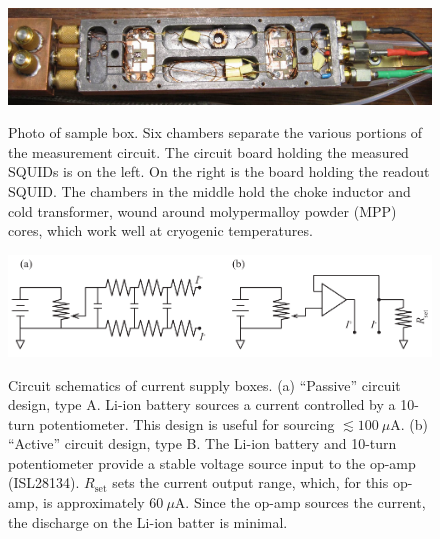\begin{figure}
\centering\includegraphics[width=6.5in]{experimental/sample_box.jpg}\\
\caption[Photo of sample box]{Photo of sample box. Six chambers separate the various portions of the measurement circuit. The circuit board holding the measured SQUIDs is on the left. On the right is the board holding the readout SQUID. The chambers in the middle hold the choke inductor and cold transformer, wound around molypermalloy powder (MPP) cores, which work well at cryogenic temperatures.}
\label{fig:experimental:sample_box}
\end{figure}

\begin{figure}
\centering\includegraphics{experimental/Fig_current_supplies}\\
\caption[Circuit schematics of current supply boxes]{Circuit schematics of current supply boxes. (a) ``Passive'' circuit design, type A. Li-ion battery sources a current controlled by a 10-turn potentiometer. This design is useful for sourcing $\lesssim 100~\mu$A. (b) ``Active'' circuit design, type B. The Li-ion battery and 10-turn potentiometer provide a stable voltage source input to the op-amp (ISL28134). $R_{\text{set}}$ sets the current output range, which, for this op-amp, is approximately $60~\mu$A. Since the op-amp sources the current, the discharge on the Li-ion batter is minimal.}
\label{fig:experimental:bias_boxes}
\end{figure}

